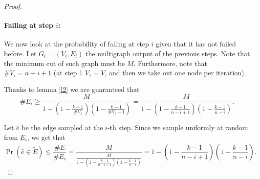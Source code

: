 \documentclass[11pt]{article}
\begin{document}
\begin{enumerate}
\begin{proof}
        \paragraph*{Failing at step $i$:}We now look at the probability of failing at step $i$ given that it has not failed before. Let $G_i = (V_i,E_i)$ the multigraph output of the previous steps. Note that the minimum cut of such graph must be $M$. Furthermore, note that $\#V_i=n-i+1$ (at step 1 $V_1 = V$, and then we take out one node per iteration).
        
        Thanks to lemma \ref{l2} we are guaranteed that
        \begin{equation*}
            \# E_i \geq \frac{M}{1-\left(1-\frac{k-1}{\#V_i}\right)\left(1-\frac{k-1}{\#V_i-1}\right)} = \frac{M}{1-\left(1-\frac{k-1}{n-i+1}\right)\left(1-\frac{k-1}{n-i}\right)}.
        \end{equation*}

        Let $\hat e$ be the edge sampled at the $i$-th step. Since we sample uniformly at random from $E_i$, we get that
        \begin{equation*}
            \Pr\left(\hat e \in \tilde E\right) \leq \frac{\#\tilde E}{\# E_i}=\frac{M}{\frac{M}{1-\left(1-\frac{k-1}{n-i+1}\right)\left(1-\frac{k-1}{n-i}\right)}} = 1-\left(1-\frac{k-1}{n-i+1}\right)\left(1-\frac{k-1}{n-i}\right).
        \end{equation*}

\end{proof}
\end{enumerate}
\end{document}
